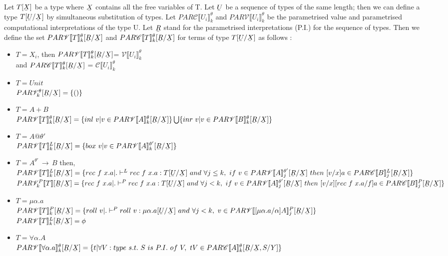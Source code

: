 \documentclass[12pt]{article}
\author{Ankit Kumar}
\newcommand{\ub}[1]{\underaccent{\bar}{#1}}
\newcommand{\arr}{\ensuremath{\,\rightarrow\,}}
\newcommand{\llrr}[1]{\llbracket {#1} \rrbracket}
\newcommand\tab[1][1cm]{\hspace*{#1}}
\begin{document}
Let $T[\ub{X}]$ be a type where $\ub{X}$ contains all the free
variables of T. Let $\ub{U}$ be a sequence of types of the same
length; then we can define a type $T[\ub{U}/\ub{X}]$ by simultaneous
substitution of types. Let $PAR\mathscr{C}\llrr{U_i}^\theta_k$ and $PAR\mathscr{V}\llrr{U_i}^\theta_k$ be
the parametrised value and parametrised  computational interpretations of the type
U. Let $\ub{R}$ stand for the parametrised interpretations (P.I.) for
the sequence of types. Then we define the set
$PAR\mathscr{V}\llrr{T}^\theta_k[\ub{R}/\ub{X}]$ and
$PAR\mathscr{C}\llrr{T}^\theta_k[\ub{R}/\ub{X}]$ for terms of type
$T[\ub{U}/\ub{X}]$ as follows :
\begin{itemize}
\item $T = X_i$, then $PAR\mathscr{V}\llrr{T}^\theta_k[\ub{R}/\ub{X}]$= $\mathscr{V}\llrr{U_i}^\theta_k$\\
\tab and $PAR\mathscr{C}\llrr{T}^\theta_k[\ub{R}/\ub{X}]$ =
$\mathscr{C}\llrr{U_i}^\theta_k$
\item $T = Unit$\\
$PAR\mathscr{V}^{\theta}_k[\ub{R}/\ub{X}]  = \{()\}$
\item $T = A+B$\\
$PAR\mathscr{V}\llrr{T}^{\theta}_k[\ub{R}/\ub{X}] = \{inl\ v | v \in
PAR\mathscr{V}\llrr{A}^{\theta}_k[\ub{R}/\ub{X}]\}  \bigcup \{inr\ v | v \in
PAR\mathscr{V}\llrr{B}^{\theta}_k[\ub{R}/\ub{X}]\} $
\item $T = A@\theta'$\\
$PAR\mathscr{V}\llrr{T}^L_k[\ub{R}/\ub{X}] = \{box\ v | v \in PAR\mathscr{V}\llrr{A}^{\theta'}_k[\ub{R}/\ub{X}]\}$

\item $T = A^{\theta'} \arr B $ then,\\
$
PAR\mathscr{V}\llrr{T}^L_k[\ub{R}/\ub{X}] = \{rec\ f\ x.a | . \vdash^L rec\ f\
  x.a : T[\ub{U}/\ub{X}]\ and\ \forall j \leq k,\ if\ v \in
  PAR\mathscr{V}\llrr{A}^{\theta'}_j[\ub{R}/\ub{X}]\ then\ [v/x]a \in  PAR\mathscr{C}\llrr{B}^L_j[\ub{R}/\ub{X}]\}
$\\
$
PAR\mathscr{V}^P_k\llrr{T}[\ub{R}/\ub{X}] = \{rec\ f\ x.a | . \vdash^P rec\ f\
  x.a : T[\ub{U}/\ub{X}]\ and\ \forall j < k,\ if\ v \in
  PAR\mathscr{V}\llrr{A}^{\theta'}_j[\ub{R}/\ub{X}]\ then\ [v/x][rec\
  f\ x.a/f]a \in  PAR\mathscr{C}\llrr{B}^P_j[\ub{R}/\ub{X}]\}
$
\item $T = \mu\alpha.a$\\
$
 PAR\mathscr{V}\llrr{T}^P_k[\ub{R}/\ub{X}] = \{roll\ v | . \vdash^P
 roll\ v: \mu\alpha.a[\ub{U}/\ub{X}]\ and\ \forall j < k,\ v \in
  PAR\mathscr{V}\llrr{[\mu\alpha.a/\alpha]A}^P_j[\ub{R}/\ub{X}]\}
$\\
 $PAR\mathscr{V}\llrr{T}^L_k[\ub{R}/\ub{X}] = \phi$ 
\item $T = \forall\alpha.A$\\
$
PAR\mathscr{V}\llrr{\forall \alpha.a}^{\theta}_k[\ub{R}/\ub{X}] = \{ t |
\forall V:type\ s.t.\ S\ is\ P.I.\ of\ V,\ tV \in PAR\mathscr{C}\llrr{A}^{\theta}_k[\ub{R}/\ub{X},S/Y]\}
$

\end{itemize}
\end{document}
